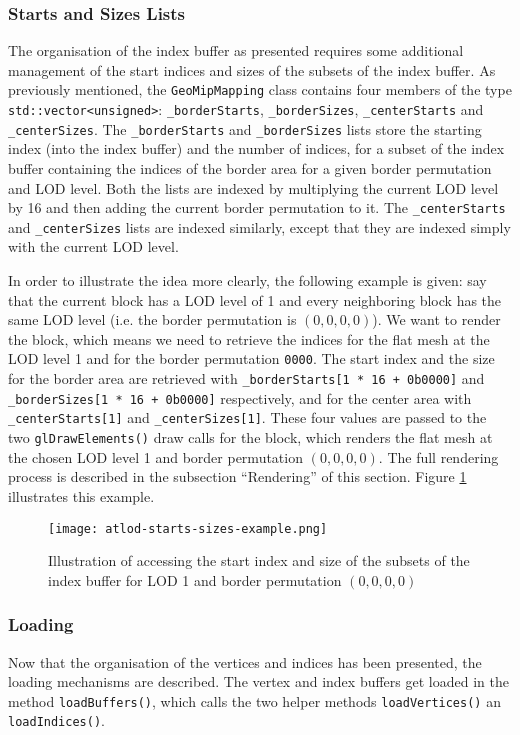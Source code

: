 \subsubsection{Starts and Sizes Lists}
The organisation of the index buffer as presented requires some additional
management of the start indices and sizes of the subsets of the index buffer. As previously mentioned, the \texttt{GeoMipMapping} class 
contains four members of the type \texttt{std::vector<unsigned>}:
\texttt{\_borderStarts}, \texttt{\_borderSizes}, \texttt{\_centerStarts} and \texttt{\_centerSizes}.
The \texttt{\_borderStarts} and \texttt{\_borderSizes} lists store the starting index 
(into the index buffer) and 
the number of indices, for a subset of the index buffer containing the indices of the border area for a given border permutation and LOD level.
Both the lists are indexed by multiplying the current LOD level by 16 
and then adding the current border permutation to it.
The \texttt{\_centerStarts} and \texttt{\_centerSizes} lists are indexed similarly,
except that they are indexed simply with the current LOD level.

In order to illustrate the idea more clearly, the following example is given:
say that the current block has a LOD level of 1 and every neighboring block has the 
same LOD level (i.e. the border permutation is $(0,0,0,0)$). 
We want to render the block, which means 
we need to retrieve the indices for the flat mesh 
at the LOD level 1 and for the border permutation \texttt{0000}.
The start index and the size for the border area are retrieved with \texttt{\_borderStarts[1 * 16 + 0b0000]}
and \texttt{\_borderSizes[1 * 16 + 0b0000]} respectively, and for 
the center area with \texttt{\_centerStarts[1]} and \texttt{\_centerSizes[1]}.
These four values are passed to the two \texttt{glDrawElements()} draw calls for the block,
which renders the flat mesh at the chosen LOD level 1 and border permutation $(0,0,0,0)$.
The full rendering process is described in the subsection ``Rendering'' of this section.
Figure \ref{fig:atlod-starts-sizes-example} illustrates this example.

\begin{figure}[H]
  \centering
  \texttt{[image: atlod-starts-sizes-example.png]}
  \caption{Illustration of accessing the start index and size of the subsets of the index buffer for LOD 1 and border permutation $(0,0,0,0)$}\label{fig:atlod-starts-sizes-example}
\end{figure}

\subsubsection{Loading}
Now that the organisation of the vertices and indices 
has been presented, the loading mechanisms are described.
The vertex and index buffers get loaded in the method \texttt{loadBuffers()},
which calls the two helper methods \texttt{loadVertices()} an \texttt{loadIndices()}.

